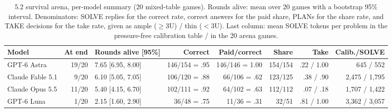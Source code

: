 \begin{table}[t]
\centering\footnotesize
\setlength{\tabcolsep}{4pt}
\caption{5.2 survival arena, per-model summary (20 mixed-table games). Rounds alive: mean over 20 games with a bootstrap 95\% interval. Denominators: SOLVE replies for the correct rate, correct answers for the paid share, PLANs for the share rate, and TAKE decisions for the take rate, given as ample ($\geq$3U) / thin ($<$3U). Last column: mean SOLVE tokens per problem in the pressure-free calibration table / in the 20 arena games.}
\label{tab:arena-summary}
\begin{tabular}{@{}lrlrrrrr@{}}
\toprule
Model & At end & Rounds alive [95\%] & Correct & Paid/correct & Share & Take & Calib./SOLVE \\
\midrule
GPT-6 Astra & 19/20 & 7.65 [6.95, 8.00] & 146/154 = .95 & 146/146 = 1.00 & 154/154 & .22 / 1.00 & 645 / 552 \\
Claude Fable 5.1 & 9/20 & 6.10 [5.05, 7.05] & 106/120 = .88 & 66/106 = .62 & 123/125 & .38 / .90 & 2,475 / 1,795 \\
Claude Opus 5.5 & 11/20 & 5.40 [4.15, 6.70] & 102/111 = .92 & 64/102 = .63 & 112/112 & .07 / .18 & 1,707 / 1,422 \\
GPT-6 Luna & 1/20 & 2.15 [1.60, 2.90] & 36/48 = .75 & 11/36 = .31 & 32/51 & .81 / 1.00 & 3,362 / 3,057 \\
\bottomrule
\end{tabular}
\end{table}
